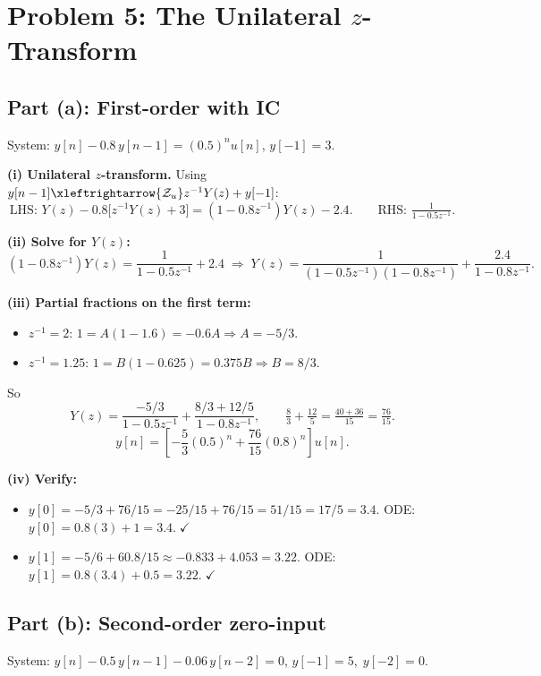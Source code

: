 \documentclass[11pt]{article}
\newcommand{\ztu}{\xleftrightarrow{\mathcal{Z}_u}}
\begin{document}
\section*{Problem 5: The Unilateral $z$-Transform}

\subsection*{Part (a): First-order with IC}
System: $y[n]-0.8\,y[n-1]=(0.5)^{n}u[n]$, $y[-1]=3$.

\textbf{(i) Unilateral $z$-transform.} Using $y[n-1]\ztu z^{-1}Y(z)+y[-1]$:
\[
\text{LHS: } Y(z)-0.8\bigl[z^{-1}Y(z)+3\bigr]=(1-0.8z^{-1})Y(z)-2.4. \qquad \text{RHS: } \tfrac{1}{1-0.5z^{-1}}.
\]

\textbf{(ii) Solve for $Y(z)$:}
\[
(1-0.8z^{-1})Y(z)=\frac{1}{1-0.5z^{-1}}+2.4\;\Rightarrow\; Y(z)=\frac{1}{(1-0.5z^{-1})(1-0.8z^{-1})}+\frac{2.4}{1-0.8z^{-1}}.
\]

\textbf{(iii) Partial fractions on the first term:}
\begin{itemize}[leftmargin=*]
\item $z^{-1}=2$: $1=A(1-1.6)=-0.6A\Rightarrow A=-5/3$.
\item $z^{-1}=1.25$: $1=B(1-0.625)=0.375B\Rightarrow B=8/3$.
\end{itemize}
So
\[
Y(z)=\frac{-5/3}{1-0.5z^{-1}}+\frac{8/3+12/5}{1-0.8z^{-1}}, \qquad \tfrac{8}{3}+\tfrac{12}{5}=\tfrac{40+36}{15}=\tfrac{76}{15}.
\]
\begin{equation*}
\boxed{y[n]=\left[-\dfrac{5}{3}(0.5)^{n}+\dfrac{76}{15}(0.8)^{n}\right]u[n].}
\end{equation*}

\textbf{(iv) Verify:}
\begin{itemize}[leftmargin=*]
\item $y[0]=-5/3+76/15=-25/15+76/15=51/15=17/5=3.4$. ODE: $y[0]=0.8(3)+1=3.4.\;\checkmark$
\item $y[1]=-5/6+60.8/15\approx-0.833+4.053=3.22$. ODE: $y[1]=0.8(3.4)+0.5=3.22.\;\checkmark$
\end{itemize}

\subsection*{Part (b): Second-order zero-input}
System: $y[n]-0.5\,y[n-1]-0.06\,y[n-2]=0$, $y[-1]=5,\;y[-2]=0$.
\end{document}
